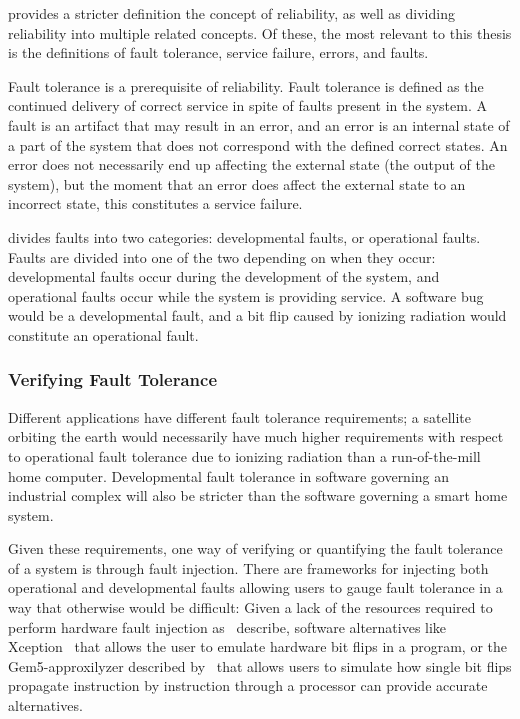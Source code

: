 \citet{avizienis2004basic} provides a stricter definition the concept of reliability, as well as dividing reliability into multiple related concepts. Of these, the most relevant to this thesis is the definitions of fault tolerance, service failure, errors, and faults.  

Fault tolerance is a prerequisite of reliability. Fault tolerance is defined as the continued delivery of correct service in spite of faults present in the system. A fault is an artifact that may result in an error, and an error is an internal state of a part of the system that does not correspond with the defined correct states. An error does not necessarily end up affecting the external state (the output of the system), but the moment that an error does affect the external state to an incorrect state, this constitutes a service failure.

\citet{avizienis2004basic} divides faults into two categories: developmental faults, or operational faults. Faults are divided into one of the two depending on when they occur: developmental faults occur during the development of the system, and operational faults occur while the system is providing service. A software bug would be a developmental fault, and a bit flip caused by ionizing radiation would constitute an operational fault.

\subsubsection{Verifying Fault Tolerance}\label{section:Verifying_fault_tolerance}

Different applications have different fault tolerance requirements; a satellite orbiting the earth would necessarily have much higher requirements with respect to operational fault tolerance due to ionizing radiation than a run-of-the-mill home computer. Developmental fault tolerance in software governing an industrial complex will also be stricter than the software governing a smart home system. 

Given these requirements, one way of verifying or quantifying the fault tolerance of a system is through fault injection. There are frameworks for injecting both operational and developmental faults allowing users to gauge fault tolerance in a way that otherwise would be difficult: Given a lack of the resources required to perform hardware fault injection as~\citet{arlat1993fault} describe, software alternatives like Xception~\citep{carreira1998xception} that allows the user to emulate hardware bit flips in a program, or the Gem5-approxilyzer described by~\citet{venkatagiri2019gem5} that allows users to simulate how single bit flips propagate instruction by instruction through a processor can provide accurate alternatives.

